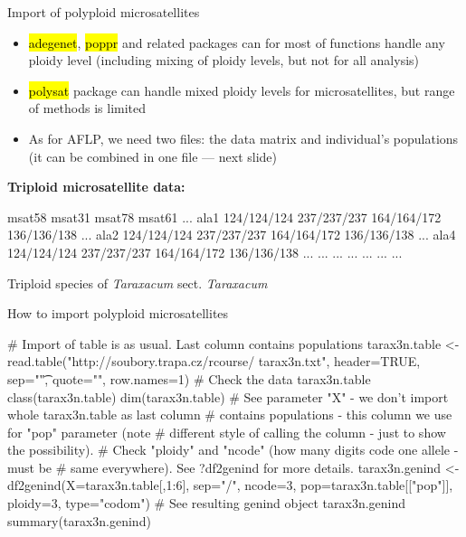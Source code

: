 \documentclass[compress, ucs, xelatex, 11pt, xcolor=svgnames,
	hyperref={
		bookmarks=true,
		unicode=true,
		colorlinks=true,
		pdftitle={Molecular data in R},
		plainpages=false,
		pdfauthor={Vojtech Zeisek},
		pdfsubject={Course about phylogeny and evolution in R},
		pdfcreator={XeLaTeX},
		pdfkeywords={R, evolution, phylogeny, molecular data},
		linkcolor=Tomato,
		anchorcolor=SaddleBrown,
		citecolor=Goldenrod,
		filecolor=DarkMagenta,
		menucolor=Sienna,
		urlcolor=DarkTurquoise,
		pdftex},
	url={hyphens, lowtilde} %
	]{beamer}
\renewcommand{\texttt}[1]{\hl{\ttfamily #1}}
\begin{document}
\begin{frame}[fragile]{Import of polyploid microsatellites}
	\vfill
	\begin{itemize}
		\item \texttt{adegenet}, \texttt{poppr} and related packages can for most of functions handle any ploidy level (including mixing of ploidy levels, but not for all analysis)
		\item \texttt{polysat} package can handle mixed ploidy levels for microsatellites, but range of methods is limited
		\item As for AFLP, we need two files: the data matrix and individual's populations (it can be combined in one file --- next slide)
	\end{itemize}
	\vfill
	\textbf{Triploid microsatellite data:}
	\vfil
	\begin{spluscode}
              msat58      msat31      msat78      msat61 ...
    ala1 124/124/124 237/237/237 164/164/172 136/136/138 ...
    ala2 124/124/124 237/237/237 164/164/172 136/136/138 ...
    ala4 124/124/124 237/237/237 164/164/172 136/136/138 ...
     ...         ...         ...         ...         ... ...
	\end{spluscode}
	\vfill
	\begin{footnotesize}
		Triploid species of \textit{Taraxacum} sect. \textit{Taraxacum}
	\end{footnotesize}
	\vfill
\end{frame}

\begin{frame}[fragile]{How to import polyploid microsatellites}
	\begin{spluscode}
    # Import of table is as usual. Last column contains populations
    tarax3n.table <- read.table("http://soubory.trapa.cz/rcourse/
      tarax3n.txt", header=TRUE, sep="\t", quote="", row.names=1)
    # Check the data
    tarax3n.table
    class(tarax3n.table)
    dim(tarax3n.table)
    # See parameter "X" - we don't import whole tarax3n.table as last column
    # contains populations - this column we use for "pop" parameter (note
    # different style of calling the column - just to show the possibility).
    # Check "ploidy" and "ncode" (how many digits code one allele - must be
    # same everywhere). See ?df2genind for more details.
    tarax3n.genind <- df2genind(X=tarax3n.table[,1:6], sep="/", ncode=3,
      pop=tarax3n.table[["pop"]], ploidy=3, type="codom")
    # See resulting genind object
    tarax3n.genind
    summary(tarax3n.genind)
	\end{spluscode}
\end{frame}
\end{document}
